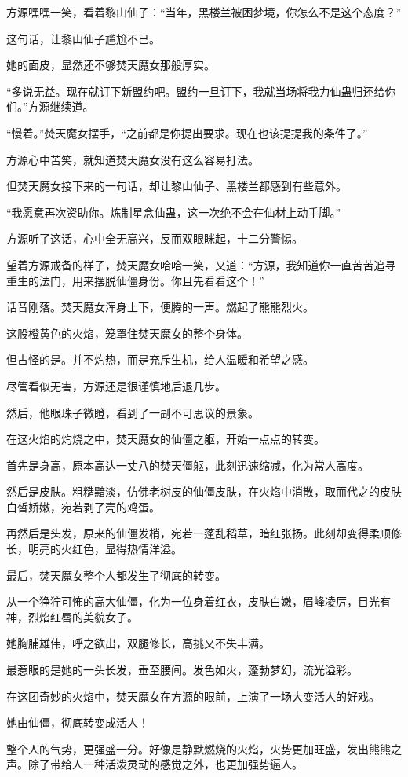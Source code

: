 \begin{this_body}
方源嘿嘿一笑，看着黎山仙子：“当年，黑楼兰被困梦境，你怎么不是这个态度？”

这句话，让黎山仙子尴尬不已。

她的面皮，显然还不够焚天魔女那般厚实。

“多说无益。现在就订下新盟约吧。盟约一旦订下，我就当场将我力仙蛊归还给你们。”方源继续道。

“慢着。”焚天魔女摆手，“之前都是你提出要求。现在也该提提我的条件了。”

方源心中苦笑，就知道焚天魔女没有这么容易打法。

但焚天魔女接下来的一句话，却让黎山仙子、黑楼兰都感到有些意外。

“我愿意再次资助你。炼制星念仙蛊，这一次绝不会在仙材上动手脚。”

方源听了这话，心中全无高兴，反而双眼眯起，十二分警惕。

望着方源戒备的样子，焚天魔女哈哈一笑，又道：“方源，我知道你一直苦苦追寻重生的法门，用来摆脱仙僵身份。你且先看看这个！”

话音刚落。焚天魔女浑身上下，便腾的一声。燃起了熊熊烈火。

这股橙黄色的火焰，笼罩住焚天魔女的整个身体。

但古怪的是。并不灼热，而是充斥生机，给人温暖和希望之感。

尽管看似无害，方源还是很谨慎地后退几步。

然后，他眼珠子微瞪，看到了一副不可思议的景象。

在这火焰的灼烧之中，焚天魔女的仙僵之躯，开始一点点的转变。

首先是身高，原本高达一丈八的焚天僵躯，此刻迅速缩减，化为常人高度。

然后是皮肤。粗糙黯淡，仿佛老树皮的仙僵皮肤，在火焰中消散，取而代之的皮肤白皙娇嫩，宛若剥了壳的鸡蛋。

再然后是头发，原来的仙僵发梢，宛若一蓬乱稻草，暗红张扬。此刻却变得柔顺修长，明亮的火红色，显得热情洋溢。

最后，焚天魔女整个人都发生了彻底的转变。

从一个狰狞可怖的高大仙僵，化为一位身着红衣，皮肤白嫩，眉峰凌厉，目光有神，烈焰红唇的美貌女子。

她胸脯雄伟，呼之欲出，双腿修长，高挑又不失丰满。

最惹眼的是她的一头长发，垂至腰间。发色如火，蓬勃梦幻，流光溢彩。

在这团奇妙的火焰中，焚天魔女在方源的眼前，上演了一场大变活人的好戏。

她由仙僵，彻底转变成活人！

整个人的气势，更强盛一分。好像是静默燃烧的火焰，火势更加旺盛，发出熊熊之声。除了带给人一种活泼灵动的感觉之外，也更加强势逼人。


\end{this_body}
